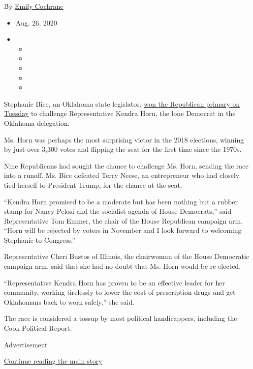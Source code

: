 By \href{https://www.nytimes3xbfgragh.onion/by/emily-cochrane}{Emily
Cochrane}

\begin{itemize}
\item
  Aug. 26, 2020
\item
  \begin{itemize}
  \item
  \item
  \item
  \item
  \item
  \end{itemize}
\end{itemize}

Stephanie Bice, an Oklahoma state legislator,
\href{https://www.nytimes3xbfgragh.onion/interactive/2020/08/25/us/elections/results-oklahoma-primary-runoff-elections.html}{won
the Republican primary on Tuesday} to challenge Representative Kendra
Horn, the lone Democrat in the Oklahoma delegation.

Ms. Horn was perhaps the most surprising victor in the 2018 elections,
winning by just over 3,300 votes and flipping the seat for the first
time since the 1970s.

Nine Republicans had sought the chance to challenge Ms. Horn, sending
the race into a runoff. Ms. Bice defeated Terry Neese, an entrepreneur
who had closely tied herself to President Trump, for the chance at the
seat.

``Kendra Horn promised to be a moderate but has been nothing but a
rubber stamp for Nancy Pelosi and the socialist agenda of House
Democrats,'' said Representative Tom Emmer, the chair of the House
Republican campaign arm. ``Horn will be rejected by voters in November
and I look forward to welcoming Stephanie to Congress.''

Representative Cheri Bustos of Illinois, the chairwoman of the House
Democratic campaign arm, said that she had no doubt that Ms. Horn would
be re-elected.

``Representative Kendra Horn has proven to be an effective leader for
her community, working tirelessly to lower the cost of prescription
drugs and get Oklahomans back to work safely,'' she said.

The race is considered a tossup by most political handicappers,
including the Cook Political Report.

Advertisement

\protect\hyperlink{after-bottom}{Continue reading the main story}

